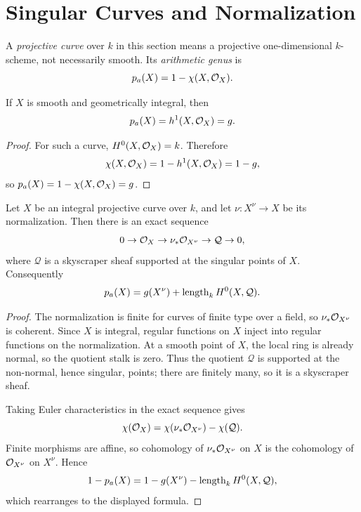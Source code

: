 \section{Singular Curves and Normalization}

\begin{definition}
A \emph{projective curve} over \(k\) in this section means a projective
one-dimensional \(k\)-scheme, not necessarily smooth.  Its \emph{arithmetic
genus} is
\[
    p_a(X)=1-\chi(X,\mathcal{O}_X).
\]
\end{definition}

\begin{proposition}
If \(X\) is smooth and geometrically integral, then
\[
    p_a(X)=h^1(X,\mathcal{O}_X)=g.
\]
\end{proposition}

\begin{proof}
For such a curve, \(H^0(X,\mathcal{O}_X)=k\).  Therefore
\[
    \chi(X,\mathcal{O}_X)=1-h^1(X,\mathcal{O}_X)=1-g,
\]
so \(p_a(X)=1-\chi(X,\mathcal{O}_X)=g\).
\end{proof}

\begin{proposition}
Let \(X\) be an integral projective curve over \(k\), and let
\(\nu:X^\nu\to X\) be its normalization.  Then there is an exact sequence
\[
    0\to\mathcal{O}_X\to\nu_*\mathcal{O}_{X^\nu}\to \mathcal Q\to0,
\]
where \(\mathcal Q\) is a skyscraper sheaf supported at the singular points of
\(X\).  Consequently
\[
    p_a(X)=g(X^\nu)+\operatorname{length}_k H^0(X,\mathcal Q).
\]
\end{proposition}

\begin{proof}
The normalization is finite for curves of finite type over a field, so
\(\nu_*\mathcal{O}_{X^\nu}\) is coherent.  Since \(X\) is integral, regular functions
on \(X\) inject into regular functions on the normalization.  At a smooth point
of \(X\), the local ring is already normal, so the quotient stalk is zero.
Thus the quotient \(\mathcal Q\) is supported at the non-normal, hence
singular, points; there are finitely many, so it is a skyscraper sheaf.

Taking Euler characteristics in the exact sequence gives
\[
    \chi(\mathcal{O}_X)=\chi(\nu_*\mathcal{O}_{X^\nu})-\chi(\mathcal Q).
\]
Finite morphisms are affine, so cohomology of \(\nu_*\mathcal{O}_{X^\nu}\) on \(X\) is
the cohomology of \(\mathcal{O}_{X^\nu}\) on \(X^\nu\).  Hence
\[
    1-p_a(X)=1-g(X^\nu)-\operatorname{length}_k H^0(X,\mathcal Q),
\]
which rearranges to the displayed formula.
\end{proof}

